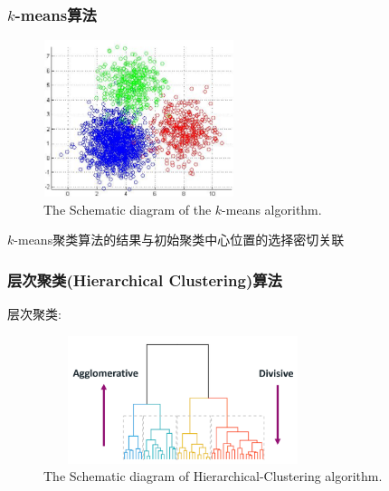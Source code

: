 \frame
{
	\frametitle{$k$-\textrm{means}算法}
\begin{figure}[h!]
\centering
\vspace*{-0.1in}
\includegraphics[height=1.80in,width=2.2in,viewport=0 0 110 90,clip]{Figures/ML_k-mean.png}
\caption{\tiny{\textrm{The Schematic diagram of the $k$-means algorithm.}}}%
\label{ML_k-means}
\end{figure}
$k$-\textrm{means}聚类算法的结果与初始聚类中心位置的选择密切关联
\vskip 3pt
{\fontsize{8.0pt}{4.2pt}}
}

\frame
{
	\frametitle{层次聚类\textrm{(Hierarchical Clustering)}算法}
	层次聚类:~{\fontsize{8.0pt}{4.2pt}\selectfont{\textcolor{blue}{通过一层一层的进行聚类}}}
	\vskip 2pt
	{\fontsize{7.0pt}{4.2pt}}
{\fontsize{7.0pt}{4.2pt}}
\begin{figure}[h!]
\centering
\vspace*{-0.04in}
\includegraphics[height=1.47in,width=3.2in,viewport=0 0 730 390,clip]{Figures/ML_Hierarchical-Clustering.png}
\caption{\tiny{\textrm{The Schematic diagram of Hierarchical-Clustering algorithm.}}}%
\label{ML_ML_Hierarchical-Clustering}
\end{figure}
}

